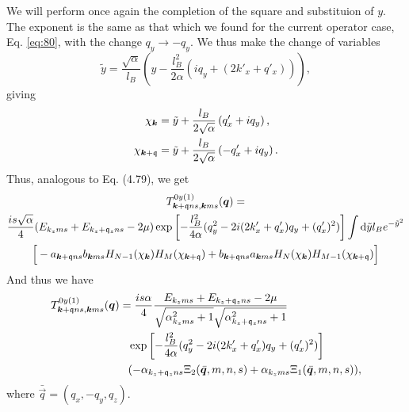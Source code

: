 We will perform once again the completion of the square and substituion of \(y\).
The exponent is the same as that which we found for the current operator case, Eq. \eqref{eq:80}, with the change \(q_{y} \to - q_{y}\).
We thus make the change of variables
\begin{equation}
  \label{eq:90}
  \tilde{y} = \frac{\sqrt{\alpha}}{l_{B}} \left(y  - \frac{l_{B}^2}{2 \alpha } (i q_{y} + (2k' _x + q' _x) )\right),
\end{equation}
giving
\begin{align}
  \chi _{\bm{k}} &= \tilde{y} + \frac{l_{B}}{2 \sqrt{\alpha }} \left( q'_x + i q_{y}\right),\\
  \chi _{\bm{k} + \mathfrak{q}} &= \tilde{y} + \frac{l_{B}}{2 \sqrt{\alpha }} \left( -q' _{x} + i q_{y}\right).
\end{align}
Thus, analogous to Eq. (4.79), we get
\begin{multline}
  \label{eq:91}
  T_{\bm{k} + \mathfrak{q} n s, \bm{k} m s}^{0y (1)} (\bm{q}) =\\
  \frac{is \sqrt{\alpha }}{4}
  (E_{k_z m s} + E_{k_z + \mathfrak{q}_z n s} - 2 \mu)
  \exp \left[
    -\frac{l_{B}^2}{4 \alpha } (q_{y}^2 - 2i (2 k' _x + q' _x) q_{y} + (q' _x)^2 )
  \right  ]
  \int \mathrm{d} \tilde{y} l_{B} e^{-\tilde{y}^2}\\
 \Big[
  - a_{\bm{k} + \mathfrak{q} ns} b_{\bm{k} m s}
  H_{N-1} ( \chi _{\bm{k}} )
  H_{M} ( \chi _{\bm{k} + \mathfrak{q}} )
  + b_{\bm{k} + \mathfrak{q} ns } a_{\bm{k} m s}
  H_{N}( \chi _{\bm{k}} )
  H_{M-1} ( \chi _{\bm{k} + \mathfrak{q}} )
  \Big]
\end{multline}
And thus we have
\begin{align}
  T_{\vec{k} + \qvec{q} n s, \vec{k} m s}^{0y (1)} (\vec{q}) &=
  \frac{is \alpha }{4  }
  \frac{E_{k_z m s} + E_{k_z + \qvec{q}_z n s} - 2 \mu}{
    \sqrt{\alpha_{k_z m s}^2 + 1}
    \sqrt{\alpha_{k_z + \qvec{q}_z n s}^2 + 1}
  }\\
  &\pe \exp \left[
    -\frac{l_{B}^2}{4 \alpha } (q_{y}^2 - 2i ( 2k' _x + q' _x ) q_{y} + (q' _x)^2)
  \right  ]\\
  &\pe (-\alpha_{k_z + \qvec{q}_z n s} \Xi_{2} (\bar{\vec{q}}, m, n, s) + \alpha_{k_z m s} \Xi_{1}(\bar{\vec{q}}, m, n, s)),
\end{align}
where \(\bar{\vec{q}} = (q_{x}, -q_{y}, q_{z})\).

